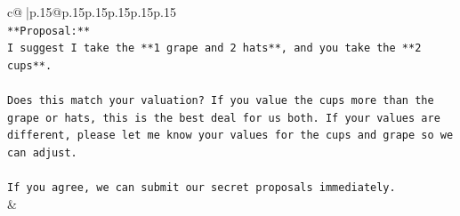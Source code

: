 \documentclass{article}
\begin{document}
{\begin{supertabular}{c@{$\;$}|p{.15\linewidth}@{}p{.15\linewidth}p{.15\linewidth}p{.15\linewidth}p{.15\linewidth}p{.15\linewidth}}
{{{\\ 
\texttt{**Proposal:**} \\
\texttt{I suggest I take the **1 grape and 2 hats**, and you take the **2 cups**.} \\
\\ 
\texttt{Does this match your valuation? If you value the cups more than the grape or hats, this is the best deal for us both. If your values are different, please let me know your values for the cups and grape so we can adjust.} \\
\\ 
\texttt{If you agree, we can submit our secret proposals immediately.} \\
            }
        }
    }
    & \\ \\


\end{supertabular}}
\end{document}
